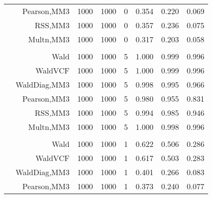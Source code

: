 \documentclass[
]{article}
\begin{document}
\begin{table}[H]
{\begin{tabular}[t]{lrrrrrrr}
\hspace{1em} & Pearson,MM3 & 1000 & 1000 & 0 & 0.354 & 0.220 & 0.069\\

\hspace{1em} & RSS,MM3 & 1000 & 1000 & 0 & 0.357 & 0.236 & 0.075\\

\hspace{1em} & Multn,MM3 & 1000 & 1000 & 0 & 0.317 & 0.203 & 0.058\\
\cmidrule{1-8}
\addlinespace[0.3em]
\multicolumn{8}{l}{\textbf{1F 15V}}\\
\hspace{1em} & Wald & 1000 & 1000 & 5 & 1.000 & 0.999 & 0.996\\

\hspace{1em} & WaldVCF & 1000 & 1000 & 5 & 1.000 & 0.999 & 0.996\\

\hspace{1em} & WaldDiag,MM3 & 1000 & 1000 & 5 & 0.998 & 0.995 & 0.966\\

\hspace{1em} & Pearson,MM3 & 1000 & 1000 & 5 & 0.980 & 0.955 & 0.831\\

\hspace{1em} & RSS,MM3 & 1000 & 1000 & 5 & 0.994 & 0.985 & 0.946\\

\hspace{1em} & Multn,MM3 & 1000 & 1000 & 5 & 1.000 & 0.998 & 0.996\\
\cmidrule{1-8}
\addlinespace[0.3em]
\multicolumn{8}{l}{\textbf{2F 10V}}\\
\hspace{1em} & Wald & 1000 & 1000 & 1 & 0.622 & 0.506 & 0.286\\

\hspace{1em} & WaldVCF & 1000 & 1000 & 1 & 0.617 & 0.503 & 0.283\\

\hspace{1em} & WaldDiag,MM3 & 1000 & 1000 & 1 & 0.401 & 0.266 & 0.083\\

\hspace{1em} & Pearson,MM3 & 1000 & 1000 & 1 & 0.373 & 0.240 & 0.077\\


\end{tabular}}
\end{table}
\end{document}
